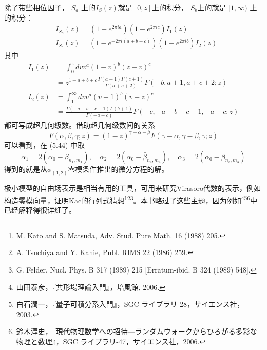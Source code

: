 除了带些相位因子， $S_a$ 上的$ I_{S}(z) $就是$ [0,z] $上的积分， $S_b $上的就是 $[1,\infty)$ 上的积分：
\begin{align} &I_{S_{a}}(z)=\left(1-e^{2 \pi i a}\right)\left(1-e^{2 \pi i c}\right) I_{1}(z)\\ &I_{S_{b}}(z)= (1-e^{-2 \pi i(a+b+c)} )\left(1-e^{2 \pi i b}\right) I_{2}(z) \end{align}
其中
\begin{align} I_{1}(z) &=\int_{0}^{z} d v v^{a}(1-v)^{b}(z-v)^{c} \\ &=z^{1+a+b+c} \frac{\Gamma(a+1) \Gamma(c+1)}{\Gamma(a+c+2)} F(-b, a+1, a+c+2 ; z) \\ I_{2}(z) &=\int_{1}^{\infty} d v v^{a}(v-1)^{b}(v-z)^{c} \\ &=\frac{\Gamma(-a-b-c-1) \Gamma(b+1)}{\Gamma(-a-c)} F(-c,-a-b-c-1,-a-c ; z) \end{align}
都可写成超几何级数。借助超几何级数间的关系
\begin{equation}
	F(\alpha, \beta, \gamma ; z)=(1-z)^{\gamma-\alpha-\beta} F(\gamma-\alpha, \gamma-\beta, \gamma ; z) 
\end{equation}
可以看到，在 (5.44) 中取
\begin{equation}
	\alpha_{1}=2\left(\alpha_{0}-\beta_{n_{1}, m_{1}}\right), \quad \alpha_{2}=2\left(\alpha_{0}-\bar{\beta}_{n_{4}, m_{4}}\right), \quad \alpha_{3}=2\left(\alpha_{0}-\beta_{n_{3}, m_{3}}\right)
\end{equation}
得到的就是从$ \phi_{(1,2)} $零模条件推出的微分方程的解。

极小模型的自由场表示是相当有用的工具，可用来研究Virasoro代数的表示，例如构造零模向量，证明Kac的行列式猜想\footnote{M. Kato and S. Matsuda, Adv. Stud. Pure Math. 16 (1988) 205.}\footnote{A. Tsuchiya and Y. Kanie, Publ. RIMS 22 (1986) 259.}\footnote{G. Felder, Nucl. Phys. B 317 (1989) 215 [Erratum-ibid. B 324 (1989) 548].}。本书略过了这些主题，因为例如\footnote{山田泰彦，『共形場理論入門』，培風館, 2006.}\footnote{白石潤一，『量子可積分系入門』，SGC ライブラリ-28，サイエンス社，2003.}\footnote{鈴木淳史，『現代物理数学への招待—ランダムウォークからひろがる多彩な物理と数理』，SGC ライブラリ-47，サイエンス社，2006.}中已经解释得很详细了。

